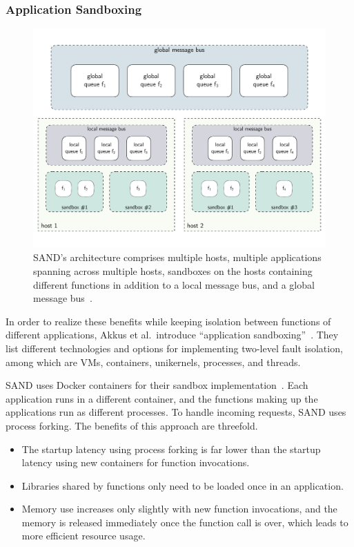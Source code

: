 \subsubsection{Application Sandboxing}\label{subsub:application_sandboxing}

\begin{figure}[!h]
    \centering
    \includegraphics[width=\linewidth]{figures/sand_architecture.pdf}
    \caption{
        SAND's architecture comprises multiple hosts, multiple applications spanning across multiple hosts, sandboxes on the hosts containing different functions in addition to a local message bus, and a global message bus~\cite{akkus2018sand}.
    }\label{fig:sand_architecture}
\end{figure}

In order to realize these benefits while keeping isolation between functions of different applications, Akkus et al.~introduce \enquote{application sandboxing}~\cite{akkus2018sand}.
They list different technologies and options for implementing two-level fault isolation, among which are VMs, containers, unikernels, processes, and threads.

SAND uses Docker containers for their sandbox implementation~\cite{akkus2018sand}.
Each application runs in a different container, and the functions making up the applications run as different processes.
To handle incoming requests, SAND uses process forking.
The benefits of this approach are threefold.
\begin{itemize}
    \item The startup latency using process forking is far lower than the startup latency using new containers for function invocations.
    \item Libraries shared by functions only need to be loaded once in an application.
    \item Memory use increases only slightly with new function invocations, and the memory is released immediately once the function call is over, which leads to more efficient resource usage.
\end{itemize}

